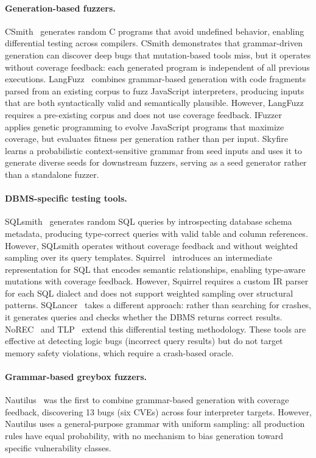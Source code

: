 \paragraph{Generation-based fuzzers.}
CSmith~\citep{csmith} generates random C programs that avoid undefined behavior, enabling differential testing across compilers. CSmith demonstrates that grammar-driven generation can discover deep bugs that mutation-based tools miss, but it operates without coverage feedback: each generated program is independent of all previous executions. LangFuzz~\citep{langfuzz} combines grammar-based generation with code fragments parsed from an existing corpus to fuzz JavaScript interpreters, producing inputs that are both syntactically valid and semantically plausible. However, LangFuzz requires a pre-existing corpus and does not use coverage feedback. IFuzzer~\citep{ifuzzer} applies genetic programming to evolve JavaScript programs that maximize coverage, but evaluates fitness per generation rather than per input. Skyfire~\citep{skyfire} learns a probabilistic context-sensitive grammar from seed inputs and uses it to generate diverse seeds for downstream fuzzers, serving as a seed generator rather than a standalone fuzzer.

\paragraph{DBMS-specific testing tools.}
SQLsmith~\citep{sqlsmith} generates random SQL queries by introspecting database schema metadata, producing type-correct queries with valid table and column references. However, SQLsmith operates without coverage feedback and without weighted sampling over its query templates. Squirrel~\citep{squirrel} introduces an intermediate representation for SQL that encodes semantic relationships, enabling type-aware mutations with coverage feedback. However, Squirrel requires a custom IR parser for each SQL dialect and does not support weighted sampling over structural patterns. SQLancer~\citep{sqlancer} takes a different approach: rather than searching for crashes, it generates queries and checks whether the DBMS returns correct results. NoREC~\citep{norec} and TLP~\citep{tlp} extend this differential testing methodology. These tools are effective at detecting logic bugs (incorrect query results) but do not target memory safety violations, which require a crash-based oracle.

\paragraph{Grammar-based greybox fuzzers.}
Nautilus~\citep{nautilus} was the first to combine grammar-based generation with coverage feedback, discovering 13 bugs (six CVEs) across four interpreter targets. However, Nautilus uses a general-purpose grammar with uniform sampling: all production rules have equal probability, with no mechanism to bias generation toward specific vulnerability classes.

